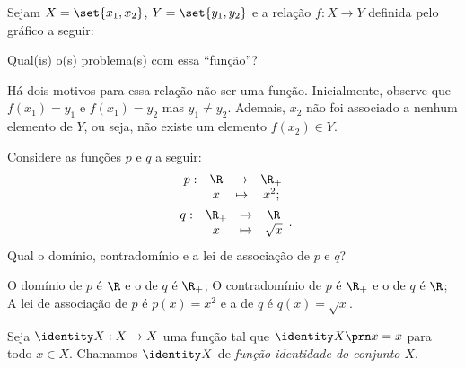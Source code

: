 \begin{example}
Sejam $X = \set{x_1, x_2}$, $Y = \set{y_1, y_2}$ e a relação $f : X \to Y$ definida pelo gráfico a seguir:
\begin{center}
\end{center}
Qual(is) o(s) problema(s) com essa ``função''?
\end{example}
\begin{solution}
Há dois motivos para essa relação não ser uma função. Inicialmente, observe que $f(x_1) = y_1$ e $f(x_1) = y_2$ mas $y_1 \neq y_2$. Ademais, $x_2$ não foi associado a nenhum elemento de $Y$, ou seja, não existe um elemento $f(x_2) \in Y$.
\end{solution}


\begin{example}
\label{example:func-sq-sqrt}
Considere as funções $p$ e $q$ a seguir:
%
\begin{gather*}
\begin{array}{cccc}
p : & \R & \to     & \R_+ \\
     &  x & \mapsto & x^2;
\end{array}\\
\begin{array}{cccc}
q : & \R_+ & \to     & \R \\
     &  x & \mapsto & \sqrt x
\end{array}.
\end{gather*}
%
Qual o domínio, contradomínio e a lei de associação de $p$ e $q$?
\end{example}

\begin{solution}
O domínio de $p$ é $\R$ e o de $q$ é $\R_+$; 
O contradomínio de $p$ é $\R_+$ e o de $q$ é $\R$; 
A lei de associação de $p$ é $p(x)=x^2$ e a de $q$ é $q(x)=\sqrt x$.
\end{solution}

\begin{definition}
\label{def:funcao-identidade-conjunto}
Seja $\identity X : X \to X $ uma função tal que $\identity X \prn x = x$ para todo $x \in X$. Chamamos $\identity X$ de \emph{função identidade do conjunto $X$}.
\end{definition}